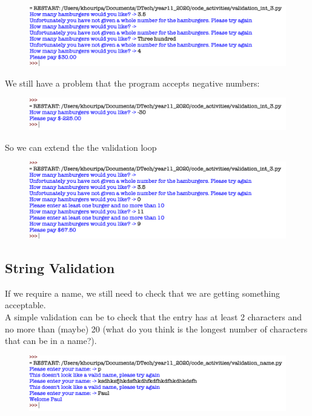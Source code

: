 \documentclass[a4paper,12pt]{article}
\begin{document}

\begin{figure} [!h]
	\centering
	\includegraphics[width=17cm]{screen_shots/validation_int_3.png}
\end{figure}
 We still have a problem that the program accepts negative numbers:
 
 \begin{figure} [!h]
 	\centering
 	\includegraphics[width=17cm]{screen_shots/validation_int_3_neg.png}
 \end{figure}

So we can extend the the validation loop

 \begin{figure} [!h]
	\centering
	\includegraphics[width=17cm]{screen_shots/validation_int_4.png}
\end{figure}
\newpage
 \subsection{String Validation}
 If we require a name, we still need to check that we are getting something acceptable.\\
 A simple validation can be to check that the entry has at least 2  characters and no more than (maybe) 20 (what do you think is the longest number of characters that can be in a name?).
 
 
 \begin{figure} [!h]
 	\centering
 	\includegraphics[width=17cm]{screen_shots/validation_name.png}
 \end{figure}
\end{document}
